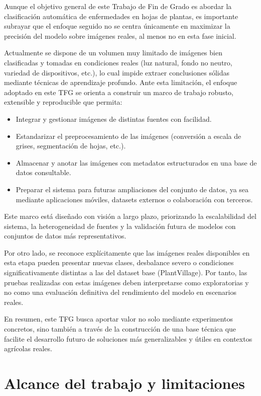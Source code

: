 \documentclass[11pt,spanish,listoffigures,listoftables]{tfgetsinf}
\begin{document}
Aunque el objetivo general de este Trabajo de Fin de Grado es abordar la clasificación automática de enfermedades en hojas de plantas, es importante subrayar que el enfoque seguido no se centra únicamente en maximizar la precisión del modelo sobre imágenes reales, al menos no en esta fase inicial.

Actualmente se dispone de un volumen muy limitado de imágenes bien clasificadas y tomadas en condiciones reales (luz natural, fondo no neutro, variedad de dispositivos, etc.), lo cual impide extraer conclusiones sólidas mediante técnicas de aprendizaje profundo. Ante esta limitación, el enfoque adoptado en este TFG se orienta a construir un marco de trabajo robusto, extensible y reproducible que permita:

\begin{itemize}
  \item Integrar y gestionar imágenes de distintas fuentes con facilidad.
  \item Estandarizar el preprocesamiento de las imágenes (conversión a escala de grises, segmentación de hojas, etc.).
  \item Almacenar y anotar las imágenes con metadatos estructurados en una base de datos consultable.
  \item Preparar el sistema para futuras ampliaciones del conjunto de datos, ya sea mediante aplicaciones móviles, datasets externos o colaboración con terceros.
\end{itemize}

Este marco está diseñado con visión a largo plazo, priorizando la escalabilidad del sistema, la heterogeneidad de fuentes y la validación futura de modelos con conjuntos de datos más representativos.

Por otro lado, se reconoce explícitamente que las imágenes reales disponibles en esta etapa pueden presentar nuevas clases, desbalance severo o condiciones significativamente distintas a las del dataset base (PlantVillage). Por tanto, las pruebas realizadas con estas imágenes deben interpretarse como exploratorias y no como una evaluación definitiva del rendimiento del modelo en escenarios reales.

En resumen, este TFG busca aportar valor no solo mediante experimentos concretos, sino también a través de la construcción de una base técnica que facilite el desarrollo futuro de soluciones más generalizables y útiles en contextos agrícolas reales.

\section{Alcance del trabajo y limitaciones}
\end{document}
